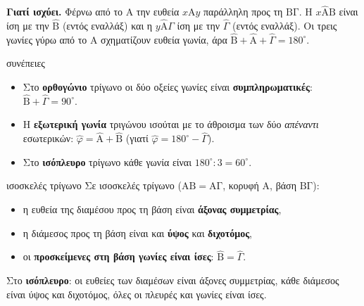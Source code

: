 \textbf{Γιατί ισχύει.} Φέρνω από το $\mathrm{Α}$ την ευθεία $x\mathrm{Α}y$ παράλληλη προς τη $\mathrm{ΒΓ}$. Η $x\hat{\mathrm{Α}}\mathrm{Β}$ είναι ίση με την $\hat{\mathrm{Β}}$ (εντός εναλλάξ) και η $y\hat{\mathrm{Α}}\Gamma$ ίση με την $\hat{\Gamma}$ (εντός εναλλάξ). Οι τρεις γωνίες γύρω από το $\mathrm{Α}$ σχηματίζουν ευθεία γωνία, άρα $\hat{\mathrm{Β}}+\hat{\mathrm{Α}}+\hat{\Gamma}=180^\circ$.

\begin{center}
\end{center}

\begin{kanonas}{συνέπειες}
\begin{itemize}[leftmargin=1.2em,itemsep=0.3ex,topsep=2pt]
\item Στο \textbf{ορθογώνιο} τρίγωνο οι δύο οξείες γωνίες είναι \textbf{συμπληρωματικές}: $\hat{\mathrm{Β}}+\hat{\Gamma}=90^\circ$.
\item Η \textbf{εξωτερική γωνία} τριγώνου ισούται με το άθροισμα των δύο \emph{απέναντι} εσωτερικών: $\hat{\varphi}=\hat{\mathrm{Α}}+\hat{\mathrm{Β}}$ (γιατί $\hat{\varphi}=180^\circ-\hat{\Gamma}$).
\item Στο \textbf{ισόπλευρο} τρίγωνο κάθε γωνία είναι $180^\circ:3=60^\circ$.
\end{itemize}
\end{kanonas}

\begin{kanonas}{ισοσκελές τρίγωνο}
Σε ισοσκελές τρίγωνο ($\mathrm{ΑΒ}=\mathrm{ΑΓ}$, κορυφή $\mathrm{Α}$, βάση $\mathrm{ΒΓ}$):
\begin{itemize}[leftmargin=1.2em,itemsep=0.3ex,topsep=2pt]
\item η ευθεία της διαμέσου προς τη βάση είναι \textbf{άξονας συμμετρίας},
\item η διάμεσος προς τη βάση είναι και \textbf{ύψος} και \textbf{διχοτόμος},
\item οι \textbf{προσκείμενες στη βάση γωνίες είναι ίσες}: $\hat{\mathrm{Β}}=\hat{\Gamma}$.
\end{itemize}
Στο \textbf{ισόπλευρο}: οι ευθείες των διαμέσων είναι άξονες συμμετρίας, κάθε διάμεσος είναι ύψος και διχοτόμος, όλες οι πλευρές και γωνίες είναι ίσες.
\end{kanonas}

